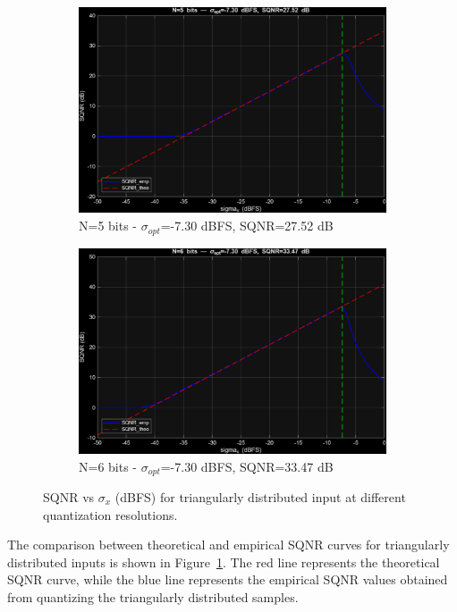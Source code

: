 \documentclass[11pt,a4paper]{article}
\begin{document}
\begin{figure}[H]
  \begin{subfigure}[t]{.4\textwidth}
    \centering
    \includegraphics[width=\linewidth]{img/task3_tri_n5.png}
    \caption{N=5 bits - $\sigma_{opt}$=-7.30 dBFS, SQNR=27.52 dB}
  \end{subfigure}
  \hfill
  \begin{subfigure}[t]{.4\textwidth}
    \centering
    \includegraphics[width=\linewidth]{img/task3_tri_n6.png}
    \caption{N=6 bits - $\sigma_{opt}$=-7.30 dBFS, SQNR=33.47 dB}
  \end{subfigure}

  \caption{SQNR vs $\sigma_x$ (dBFS) for triangularly distributed input at different quantization resolutions.}
  \label{fig:task3_tri_sqnr_vs_sigma}
\end{figure}

The comparison between theoretical and empirical SQNR curves for triangularly distributed inputs is shown in Figure~\ref{fig:task3_tri_sqnr_vs_sigma}.
The red line represents the theoretical SQNR curve, while the blue line represents the empirical SQNR values obtained from quantizing the triangularly distributed samples.
\end{document}
